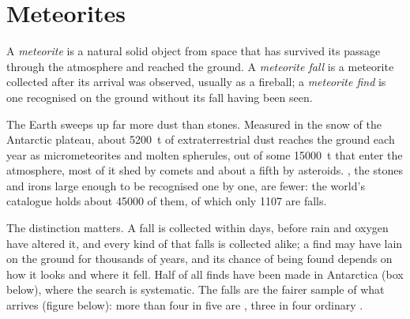 \section{Meteorites}

\begin{definition}
\label{def:b2:planet-formation-meteorites:fall-find}
A \emph{meteorite} is a natural solid object from space that
has survived its passage through the atmosphere and reached the ground. A
\emph{meteorite fall} is a meteorite collected after its
arrival was observed, usually as a fireball; a \emph{meteorite
find} is one recognised on the ground without its fall
having been seen.
\end{definition}

The Earth sweeps up far more dust than stones. Measured in the snow of the
Antarctic plateau, about \qty{5200}{t} of extraterrestrial dust reaches the
ground each year as micrometeorites and molten spherules, out of some
\qty{15000}{t} that enter the atmosphere, most of it shed by comets and about a
fifth by asteroids. , the stones and irons large enough to be
recognised one by one, are fewer: the world's catalogue holds about
\num{45000} of them, of which only \num{1107} are falls.

The distinction matters. A fall is collected within days, before rain and
oxygen have altered it, and every kind of  that falls is collected
alike; a find may have lain on the ground for thousands of years, and its
chance of being found depends on how it looks and where it fell. Half of all
finds have been made in Antarctica (box below), where the search is
systematic. The falls are the fairer sample of what arrives (figure below):
more than four in five are , three in four ordinary .

